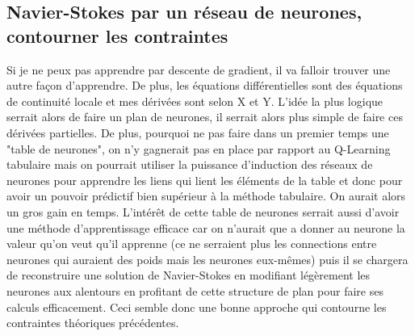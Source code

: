 \documentclass[10pt]{article}
\begin{document}
\subsection{Navier-Stokes par un réseau de neurones, contourner les contraintes}
Si je ne peux pas apprendre par descente de gradient, il va falloir trouver une autre façon d'apprendre. De plus, les équations différentielles sont des équations de continuité locale et mes dérivées sont selon X et Y. L'idée la plus logique serrait alors de faire un plan de neurones, il serrait alors plus simple de faire ces dérivées partielles. De plus, pourquoi ne pas faire dans un premier temps une "table de neurones", on n'y gagnerait pas en place par rapport au Q-Learning tabulaire mais on pourrait utiliser la puissance d'induction des réseaux de neurones pour apprendre les liens qui lient les éléments de la table et donc pour avoir un pouvoir prédictif bien supérieur à la méthode tabulaire. On aurait alors un gros gain en temps. L'intérêt de cette table de neurones serrait aussi d'avoir une méthode d'apprentissage efficace car on n'aurait que a donner au neurone la valeur qu'on veut qu'il apprenne (ce ne serraient plus les connections entre neurones qui auraient des poids mais les neurones eux-mêmes) puis il se chargera de reconstruire une solution de Navier-Stokes en modifiant légèrement les neurones aux alentours en profitant de cette structure de plan pour faire ses calculs efficacement. Ceci semble donc une bonne approche qui contourne les contraintes théoriques précédentes.
\end{document}

